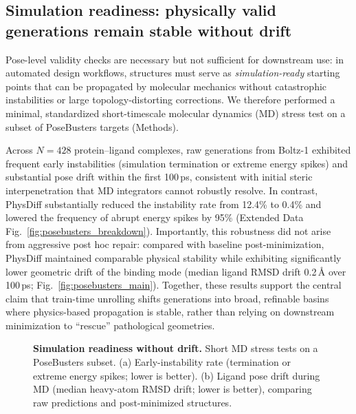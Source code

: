 \documentclass[twocolumn,10pt]{article}
\newcommand{\modelname}{PhysDiff}
\newcommand{\OpenBaseline}{Boltz-1}
\begin{document}
\subsection{Simulation readiness: physically valid generations remain stable without drift}\label{sec:md_ready}
Pose-level validity checks are necessary but not sufficient for downstream use: in automated design workflows, structures must serve as \emph{simulation-ready} starting points that can be propagated by molecular mechanics without catastrophic instabilities or large topology-distorting corrections.
We therefore performed a minimal, standardized short-timescale molecular dynamics (MD) stress test on a subset of PoseBusters targets (Methods).

Across $N=428$ protein--ligand complexes, raw generations from \OpenBaseline{} exhibited frequent early instabilities (simulation termination or extreme energy spikes) and substantial pose drift within the first 100\,ps, consistent with initial steric interpenetration that MD integrators cannot robustly resolve.
In contrast, \modelname{} substantially reduced the instability rate from 12.4\% to 0.4\% and lowered the frequency of abrupt energy spikes by 95\% (Extended Data Fig.~\ref{fig:posebusters_breakdown}).
Importantly, this robustness did not arise from aggressive post hoc repair: compared with baseline post-minimization, \modelname{} maintained comparable physical stability while exhibiting significantly lower geometric drift of the binding mode (median ligand RMSD drift 0.2\,\AA{} over 100\,ps; Fig.~\ref{fig:posebusters_main}).
Together, these results support the central claim that train-time unrolling shifts generations into broad, refinable basins where physics-based propagation is stable, rather than relying on downstream minimization to ``rescue'' pathological geometries.

\begin{figure}[t]
    \centering
    \caption{\textbf{Simulation readiness without drift.}
    Short MD stress tests on a PoseBusters subset.
    (a) Early-instability rate (termination or extreme energy spikes; lower is better).
    (b) Ligand pose drift during MD (median heavy-atom RMSD drift; lower is better), comparing raw predictions and post-minimized structures.
    }
    \label{fig:md_main}
\end{figure}
\end{document}
